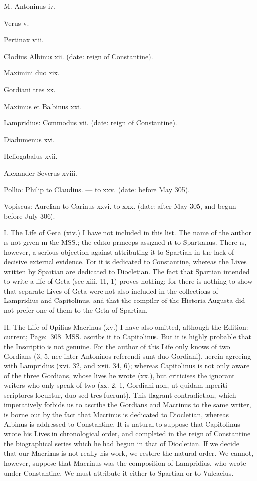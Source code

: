 M. Antoninus
iv.

Verus
v.

Pertinax
viii.

Clodius Albinus
xii. (date: reign of Constantine).

Maximini duo
xix.

Gordiani tres
xx.

Maximus et Balbinus
xxi.

Lampridius:
Commodus
vii. (date: reign of Constantine).

Diadumenus
xvi.

Heliogabalus
xvii.

Alexander Severus
xviii.

Pollio:
Philip to Claudius.
\texthebrew{—} to xxv.
(date: before May 305).

Vopiscus:
Aurelian to Carinus
xxvi. to xxx.
(date: after May 305, and begun before July 306).

I. The Life of Geta (xiv.) I have not included in this list. The name of the author is not given in the MSS.; the editio princeps assigned it to Spartianus. There is, however, a serious objection against attributing it to Spartian in the lack of decisive external evidence. For it is dedicated to Constantine, whereas the Lives written by Spartian are dedicated to Diocletian. The fact that Spartian intended to write a life of Geta (see xiii. 11, 1) proves nothing; for there is nothing to show that separate Lives of Geta were not also included in the collections of Lampridius and Capitolinus, and that the compiler of the Historia Augusta did not prefer one of them to the Geta of Spartian.

II. The Life of Opilius Macrinus (xv.) I have also omitted, although the Edition: current; Page: [308] MSS. ascribe it to Capitolinus. But it is highly probable that the Inscriptio is not genuine. For the author of this Life only knows of two Gordians (3, 5, nec inter Antoninos referendi sunt duo Gordiani), herein agreeing with Lampridius (xvi. 32, and xvii. 34, 6); whereas Capitolinus is not only aware of the three Gordians, whose lives he wrote (xx.), but criticises the ignorant writers who only speak of two (xx. 2, 1, Gordiani non, ut quidam inperiti scriptores locuntur, duo sed tres fuerunt). This flagrant contradiction, which imperatively forbids us to ascribe the Gordians and Macrinus to the same writer, is borne out by the fact that Macrinus is dedicated to Diocletian, whereas Albinus is addressed to Constantine. It is natural to suppose that Capitolinus wrote his Lives in chronological order, and completed in the reign of Constantine the biographical series which he had begun in that of Diocletian. If we decide that our Macrinus is not really his work, we restore the natural order. We cannot, however, suppose that Macrinus was the composition of Lampridius, who wrote under Constantine. We must attribute it either to Spartian or to Vulcacius.

